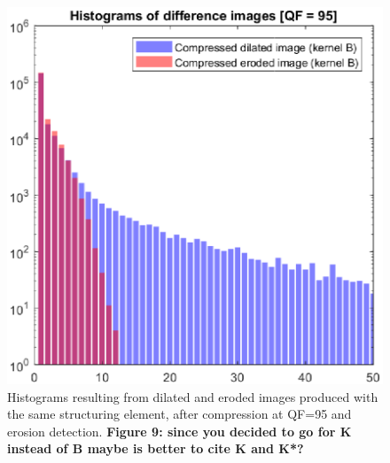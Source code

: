 \documentclass{ieeeaccess}
\begin{document}
\begin{figure}[t!]
	\centering
	\includegraphics[width=\linewidth]{hist_dil_ero_same.eps}
	\caption{Histograms resulting from dilated and eroded images produced with the same structuring element, after compression at QF=95 and erosion detection. \textbf{Figure 9: since you decided to go for K instead of B maybe is better to cite K and K*?}}
	\label{fig:hist_dil_ero_same}
\end{figure}
\end{document}

